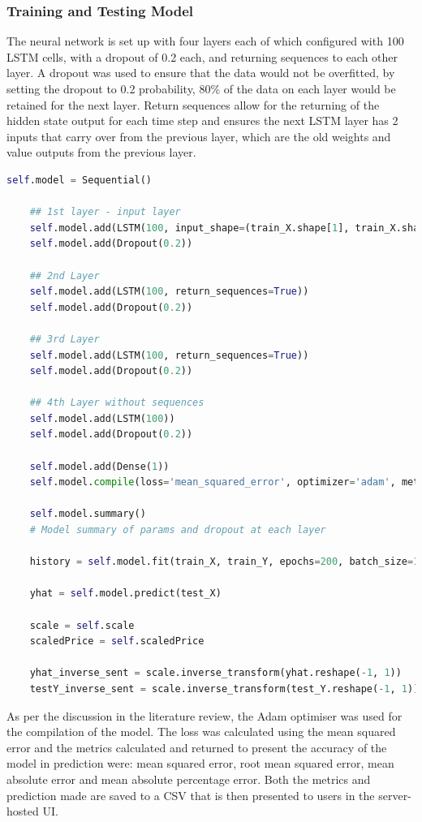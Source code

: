 \documentclass[oneside, 12pt]{article}
\begin{document}
		\subsubsection{Training and Testing Model}
		
		The neural network is set up with four layers each of which configured with 100 LSTM cells, with a dropout of 0.2 each, and returning sequences to each other layer. A dropout was used to ensure that the data would not be overfitted, by setting the dropout to 0.2 probability, 80\% of the data on each layer would be retained for the next layer. Return sequences allow for the returning of the hidden state output for each time step and ensures the next LSTM layer has 2 inputs that carry over from the previous layer, which are the old weights and value outputs from the previous layer.
			
		\begin{lstlisting}[language=python, caption=LSTM model creation\, layering\, compiling and fitting]
	self.model = Sequential()
	
	## 1st layer - input layer
	self.model.add(LSTM(100, input_shape=(train_X.shape[1], train_X.shape[2]), return_sequences=True))
	self.model.add(Dropout(0.2))
	
	## 2nd Layer
	self.model.add(LSTM(100, return_sequences=True))
	self.model.add(Dropout(0.2))
	
	## 3rd Layer
	self.model.add(LSTM(100, return_sequences=True))
	self.model.add(Dropout(0.2))
	
	## 4th Layer without sequences
	self.model.add(LSTM(100))
	self.model.add(Dropout(0.2))
	
	self.model.add(Dense(1))
	self.model.compile(loss='mean_squared_error', optimizer='adam', metrics=['mse', 'mae', 'mape'])
	
	self.model.summary()
	# Model summary of params and dropout at each layer
	
	history = self.model.fit(train_X, train_Y, epochs=200, batch_size=1000, validation_data=(test_X, test_Y), verbose=0, shuffle=False, callbacks=[TQDMCallback()])
	
	yhat = self.model.predict(test_X)
	
	scale = self.scale
	scaledPrice = self.scaledPrice
	
	yhat_inverse_sent = scale.inverse_transform(yhat.reshape(-1, 1))
	testY_inverse_sent = scale.inverse_transform(test_Y.reshape(-1, 1))
		\end{lstlisting}	
		
		As per the discussion in the literature review, the Adam optimiser was used for the compilation of the model. The loss was calculated using the mean squared error and the metrics calculated and returned to present the accuracy of the model in prediction were: mean squared error, root mean squared error, mean absolute error and mean absolute percentage error. Both the metrics and prediction made are saved to a CSV that is then presented to users in the server-hosted UI.
		
\end{document}

